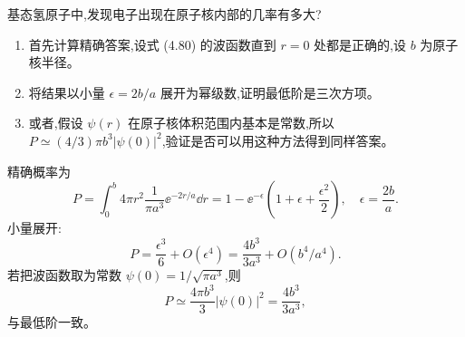 \begin{question}
基态氢原子中,发现电子出现在原子核内部的几率有多大?
\begin{enumerate}
\item 首先计算精确答案,设式 (4.80) 的波函数直到 $r=0$ 处都是正确的,设 $b$ 为原子核半径。
\item 将结果以小量 $\epsilon=2b/a$ 展开为幂级数,证明最低阶是三次方项。
\item 或者,假设 $\psi(r)$ 在原子核体积范围内基本是常数,所以 $P\simeq(4/3)\pi b^3|\psi(0)|^2$,验证是否可以用这种方法得到同样答案。
\end{enumerate}

\par\smallskip
{}

\end{question}
\begin{solution}

精确概率为
\[
P=\int_0^b4\pi r^2\frac{1}{\pi a^3}\ee^{-2r/a}\dd r
=1-\ee^{-\epsilon}\left(1+\epsilon+\frac{\epsilon^2}{2}\right),
\quad \epsilon=\frac{2b}{a}.
\]
小量展开:
\[
P=\frac{\epsilon^3}{6}+O(\epsilon^4)=\frac{4b^3}{3a^3}+O(b^4/a^4).
\]
若把波函数取为常数 $\psi(0)=1/\sqrt{\pi a^3}$,则
\[
P\simeq \frac{4\pi b^3}{3}|\psi(0)|^2=\frac{4b^3}{3a^3},
\]
与最低阶一致。

\end{solution}

